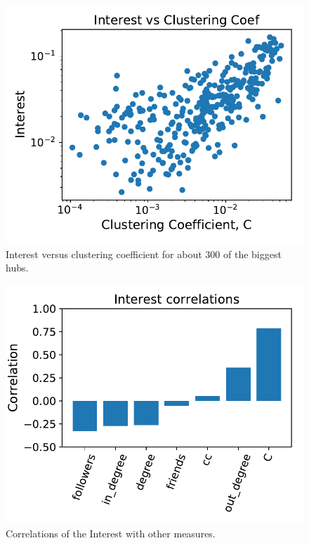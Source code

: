 \documentclass[11pt, twoside]{report}
\begin{document}
\begin{minipage}[b]{0.5\textwidth}
   \centering
    \begin{figure}[H]
      \includegraphics[width=\textwidth]{../../scripts/network_analysis/imgs/hubs_interest_corr.pdf}
          \caption{Interest versus clustering coefficient for about 300 of the biggest hubs.}
      \label{fig:interest_corr}
\end{figure}
\end{minipage}
\begin{minipage}[b]{0.5\textwidth}
  \begin{figure}[H]
  \centering
  \includegraphics[width=\textwidth]{../../scripts/network_analysis/imgs/hubs_interest_corr_hist.pdf}
  \caption{Correlations of the Interest with other measures.}
  \label{fig:interest_corr_hist}
\end{figure}
\end{minipage}
\end{document}
